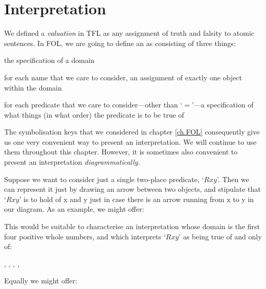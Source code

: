 \section{Interpretation}
We defined a \emph{valuation} in TFL as any assignment of truth and falsity to atomic sentences. In FOL, we are going to define an  as consisting of three things:
	\begin{ebullet}	
		\item the specification of a domain
		\item for each name that we care to consider, an assignment of exactly one object within the domain 
		\item for each predicate that we care to consider---other than `$=$'---a specification of what things (in what order) the predicate is to be true of
	\end{ebullet}
The symbolisation keys that we considered in chapter \ref{ch.FOL} consequently give us one very convenient way to present an interpretation. We will continue to use them throughout this chapter. However, it is sometimes also convenient to present an interpretation \emph{diagrammatically}. 

Suppose we want to consider just a single two-place predicate, `$Rxy$'. Then we can represent it just by drawing an arrow between two objects, and stipulate that `$Rxy$' is to hold of x and y just in case there is an arrow running from x to y in our diagram. As an example, we might offer:
\begin{center}
\end{center}
This would be suitable to characterise an interpretation whose domain is the first four positive whole numbers, and which interprets `$Rxy$' as being true of and only of:
	\begin{center}
		, 
		, 
		, 
		, 
	\end{center}
Equally we might offer:

